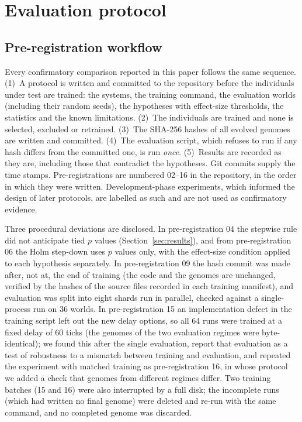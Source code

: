 \section{Evaluation protocol}
\label{sec:protocol}

\subsection{Pre-registration workflow}
Every confirmatory comparison reported in this paper follows the same sequence. (1)~A protocol is written and committed to the repository before the individuals under test are trained: the systems, the training command, the evaluation worlds (including their random seeds), the hypotheses with effect-size thresholds, the statistics and the known limitations. (2)~The individuals are trained and none is selected, excluded or retrained. (3)~The SHA-256 hashes of all evolved genomes are written and committed. (4)~The evaluation script, which refuses to run if any hash differs from the committed one, is run \emph{once}. (5)~Results are recorded as they are, including those that contradict the hypotheses. Git commits supply the time stamps. Pre-registrations are numbered 02--16 in the repository, in the order in which they were written. Development-phase experiments, which informed the design of later protocols, are labelled as such and are not used as confirmatory evidence.

Three procedural deviations are disclosed. In pre-registration 04 the stepwise rule did not anticipate tied $p$ values (Section~\ref{sec:results}), and from pre-registration 06 the Holm step-down uses $p$ values only, with the effect-size condition applied to each hypothesis separately. In pre-registration 09 the hash commit was made after, not at, the end of training (the code and the genomes are unchanged, verified by the hashes of the source files recorded in each training manifest), and evaluation was split into eight shards run in parallel, checked against a single-process run on 36 worlds. In pre-registration 15 an implementation defect in the training script left out the new delay options, so all 64 runs were trained at a fixed delay of 60 ticks (the genomes of the two evaluation regimes were byte-identical); we found this after the single evaluation, report that evaluation as a test of robustness to a mismatch between training and evaluation, and repeated the experiment with matched training as pre-registration 16, in whose protocol we added a check that genomes from different regimes differ. Two training batches (15 and 16) were also interrupted by a full disk; the incomplete runs (which had written no final genome) were deleted and re-run with the same command, and no completed genome was discarded.

